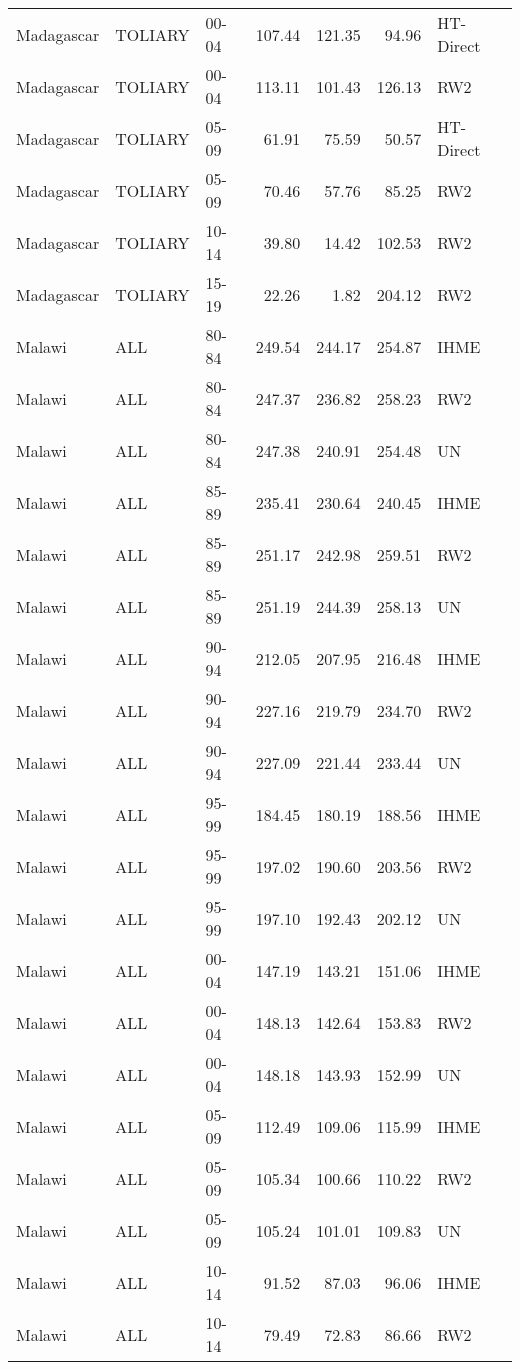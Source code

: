 \begin{longtable}{lllrrrl}
  Madagascar & TOLIARY & 00-04 & 107.44 & 121.35 & 94.96 & HT-Direct \\ 
  Madagascar & TOLIARY & 00-04 & 113.11 & 101.43 & 126.13 & RW2 \\ 
  Madagascar & TOLIARY & 05-09 & 61.91 & 75.59 & 50.57 & HT-Direct \\ 
  Madagascar & TOLIARY & 05-09 & 70.46 & 57.76 & 85.25 & RW2 \\ 
  Madagascar & TOLIARY & 10-14 & 39.80 & 14.42 & 102.53 & RW2 \\ 
  Madagascar & TOLIARY & 15-19 & 22.26 & 1.82 & 204.12 & RW2 \\ 
  Malawi & ALL & 80-84 & 249.54 & 244.17 & 254.87 & IHME \\ 
  Malawi & ALL & 80-84 & 247.37 & 236.82 & 258.23 & RW2 \\ 
  Malawi & ALL & 80-84 & 247.38 & 240.91 & 254.48 & UN \\ 
  Malawi & ALL & 85-89 & 235.41 & 230.64 & 240.45 & IHME \\ 
  Malawi & ALL & 85-89 & 251.17 & 242.98 & 259.51 & RW2 \\ 
  Malawi & ALL & 85-89 & 251.19 & 244.39 & 258.13 & UN \\ 
  Malawi & ALL & 90-94 & 212.05 & 207.95 & 216.48 & IHME \\ 
  Malawi & ALL & 90-94 & 227.16 & 219.79 & 234.70 & RW2 \\ 
  Malawi & ALL & 90-94 & 227.09 & 221.44 & 233.44 & UN \\ 
  Malawi & ALL & 95-99 & 184.45 & 180.19 & 188.56 & IHME \\ 
  Malawi & ALL & 95-99 & 197.02 & 190.60 & 203.56 & RW2 \\ 
  Malawi & ALL & 95-99 & 197.10 & 192.43 & 202.12 & UN \\ 
  Malawi & ALL & 00-04 & 147.19 & 143.21 & 151.06 & IHME \\ 
  Malawi & ALL & 00-04 & 148.13 & 142.64 & 153.83 & RW2 \\ 
  Malawi & ALL & 00-04 & 148.18 & 143.93 & 152.99 & UN \\ 
  Malawi & ALL & 05-09 & 112.49 & 109.06 & 115.99 & IHME \\ 
  Malawi & ALL & 05-09 & 105.34 & 100.66 & 110.22 & RW2 \\ 
  Malawi & ALL & 05-09 & 105.24 & 101.01 & 109.83 & UN \\ 
  Malawi & ALL & 10-14 & 91.52 & 87.03 & 96.06 & IHME \\ 
  Malawi & ALL & 10-14 & 79.49 & 72.83 & 86.66 & RW2 \\ 

\end{longtable}
